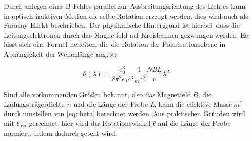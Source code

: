 Durch anlegen eines B-Feldes parallel zur Ausbreitungsrichtung des Lichtes kann in optisch inaktiven Medien die selbe Rotation erzeugt werden, dies
wird auch als Faraday Effekt beschrieben. Der physikalische Hintergrund ist hierbei, dass die Leitungselektronen durch das Magnetfeld auf Kreisbahnen
gezwungen werden. Es lässt sich eine Formel herleiten, die die Rotation der Polarisationsebene in Abhängigkeit der Wellenlänge angibt:

\begin{equation}
    \theta(\lambda)=\frac{\text{e}_0^3}{8\pi^2\epsilon_0c^3}\frac{1}{{m^*}^2}\frac{NBL}{n}\lambda^2\,
    \label{eq:theta}
\end{equation}

Sind alle vorkommenden Größen bekannt, also das Magnetfeld $B$, die Ladungsträgerdichte $n$ und die Länge der Probe $L$, kann die effektive Masse
$m^*$ durch umstellen von \eqref{eq:theta} berechnet werden.
Aus praktischen Gründen wird mit $\theta_\text{frei}$ gerechnet, hier wird der Rotationswinkel $\theta$ auf die Länge der Probe normiert, indem dadurch
geteilt wird.